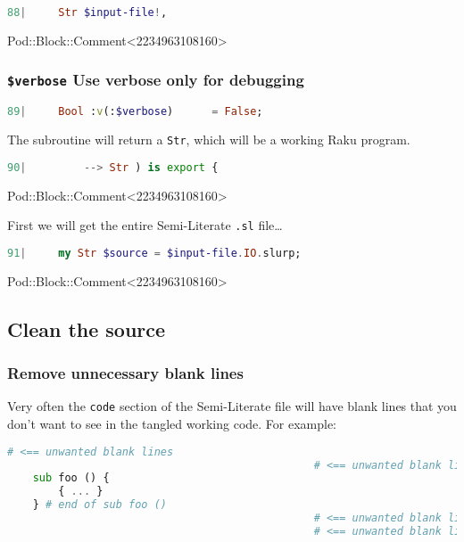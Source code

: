 \documentclass{scrartcl}
\begin{document}
\begin{lstlisting}[language=Raku]
   88|     Str $input-file!,

\end{lstlisting}


Pod::Block::Comment<2234963108160>

\subsubsection{\texttt{\$verbose} Use verbose only for debugging}

\begin{lstlisting}[language=Raku]
   89|     Bool :v(:$verbose)      = False;

\end{lstlisting}


The subroutine will return a \texttt{Str}, which will be a working Raku
program.

\begin{lstlisting}[language=Raku]
   90|         --> Str ) is export {

\end{lstlisting}


Pod::Block::Comment<2234963108160>

First we will get the entire Semi-Literate \texttt{.sl} file…

\begin{lstlisting}[language=Raku]
   91|     my Str $source = $input-file.IO.slurp;

\end{lstlisting}


Pod::Block::Comment<2234963108160>

\subsection{Clean the source}

\subsubsection{Remove unnecessary blank lines}

Very often the \texttt{code} section of the Semi-Literate file will have
blank lines that you don't want to see in the tangled working code. For
example:

\begin{lstlisting}[language=Raku]
                                                # <== unwanted blank lines
                                                # <== unwanted blank lines
    sub foo () {
        { ... }
    } # end of sub foo ()
                                                # <== unwanted blank lines
                                                # <== unwanted blank lines


\end{lstlisting}
\end{document}
